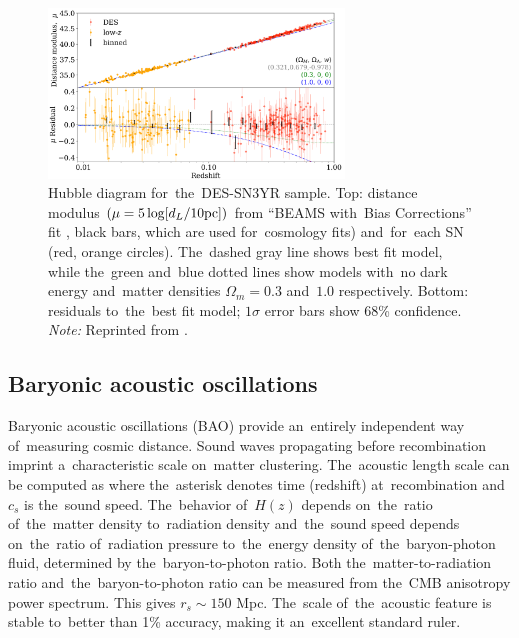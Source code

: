 \begin{figure}[hbt]
    \centering
    \includegraphics[width=0.7\textwidth]{cosmo_evol/DES_SNe_results.png}
    \caption{Hubble diagram for~the~DES-SN3YR sample. Top: distance modulus $(\mu =5\log [d_L/10\rm{pc}])$ from ``BEAMS with~Bias Corrections'' fit \parencite{Kessler_2017}, black bars, which are used for~cosmology fits) and~for~each SN (red, orange circles). The~dashed gray line shows best fit model, while the~green and~blue dotted lines show models with~no dark energy and~matter densities $\Omega_m = 0.3$ and~$1.0$ respectively. Bottom: residuals to~the~best fit model; $1\sigma$ error bars show 68\% confidence. \textit{Note:} Reprinted from \textcite{Abbott_2019}.}
    \label{fig:des_sne_results}
\end{figure}
\DIFdelbegin %
\DIFdelend \DIFaddbegin \subsection[Baryonic acoustic oscillations]{\DIFaddend Baryonic acoustic oscillations\DIFaddbegin {}\DIFaddend }
\label{sec:bao}
Baryonic acoustic oscillations (BAO) provide an~entirely independent way of~measuring cosmic distance. Sound waves propagating before recombination imprint a~characteristic scale on~matter clustering. The~acoustic length scale can be computed as
where the~asterisk denotes time (redshift) at~recombination and~$c_s$ is the~sound speed. The~behavior of~$H(z)$ depends on~the~ratio of~the~matter density to~radiation density and~the~sound speed depends on~the~ratio of~radiation pressure to~the~energy density of~the~baryon-photon fluid, determined by the~baryon-to-photon ratio. Both the~matter-to-radiation ratio and~the~baryon-to-photon ratio can be measured from the~CMB anisotropy power spectrum. This gives $r_s\sim150$ Mpc. The~scale of~the~acoustic feature is stable to~better than 1\% accuracy, making it an~excellent standard ruler.

